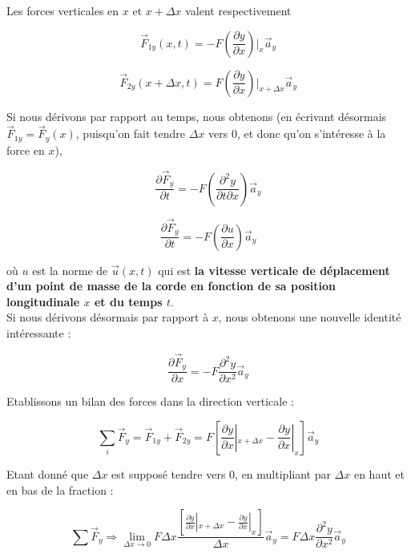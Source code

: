 Les forces verticales en $x$ et $x+\Delta x$ valent respectivement

\begin{equation}
\vec{F}_{1y}(x,t) = - F  (\frac{\partial y}{\partial x})|_{x}  \vec{a}_{y} 
\label{Force1}
\end{equation}

\begin{equation}
\vec{F}_{2y}(x+\Delta x,t) = F (\frac{\partial y}{\partial x})|_{x+\Delta x} \vec{a}_{y}
\label{Force2}
\end{equation}

Si nous dérivons par rapport au temps, nous obtenons (en écrivant désormais $\vec{F}_{1y} = \vec{F}_{y}(x)$, puisqu'on fait tendre $\Delta x$ vers $0$, et donc qu'on s'intéresse à la force en $x$),

\begin{equation}
\frac{\partial \vec{F}_{y}}{\partial t} = - F (\frac{\partial^{2} y}{\partial t \partial x}) \vec{a}_{y}
\label{Force3}
\end{equation}

\begin{equation}
\frac{\partial \vec{F}_{y}}{\partial t} = - F (\frac{\partial u}{\partial x}) \vec{a}_{y}
\label{Force4}
\end{equation}

où $u$ est la norme de $\vec{u}(x,t)$ qui est \textbf{la vitesse verticale de déplacement d'un point de masse de la corde en fonction de sa position longitudinale $x$ et du temps $t$}. \\ 

Si nous dérivons désormais par rapport à $x$, nous obtenons une nouvelle identité intéressante : 

\begin{equation}
\frac{\partial \vec{F}_{y}}{\partial x} = -F \frac{\partial^{2} y}{\partial x^{2}} \vec{a}_{y} 
\label{ForceLOL}
\end{equation}

Etablissons un bilan des forces dans la direction verticale : 

\[\sum_{i} \vec{F}_{y} = \vec{F}_{1y} + \vec{F}_{2y}  = F [\frac{\partial y}{\partial x}|_{x+\Delta x} - \frac{\partial y}{\partial x}|_{x}] \vec{a}_{y} \]

Etant donné que $\Delta x$ est supposé tendre vers $0$, en multipliant par $\Delta x$ en haut et en bas de la fraction : 

\begin{equation}
\sum \vec{F}_{y} \Rightarrow \lim_{\Delta x \to 0}  F \Delta x \frac{[\frac{\partial y}{\partial x}|_{x+\Delta x} - \frac{\partial y}{\partial x}|_{x}]}{\Delta x} \vec{a}_{y} = F \Delta x \frac{\partial^{2} y }{\partial x^{2}} \vec{a}_{y} 
\label{Force5}
\end{equation}

